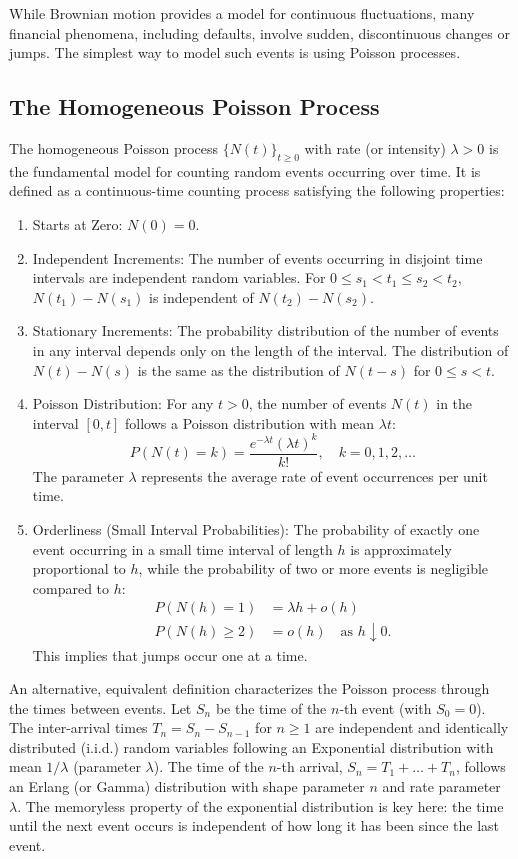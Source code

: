 \documentclass[11pt,twoside,openright]{report}
\begin{document}
While Brownian motion provides a model for continuous fluctuations, many financial phenomena, including defaults, involve sudden, discontinuous changes or jumps. The simplest way to model such events is using Poisson processes.

\subsection{The Homogeneous Poisson Process}
\label{subsec:homo_poisson}

The homogeneous Poisson process $\{N(t)\}_{t \ge 0}$ with rate (or intensity) $\lambda > 0$ is the fundamental model for counting random events occurring over time. It is defined as a continuous-time counting process satisfying the following properties:
\begin{enumerate}
    \item Starts at Zero: $N(0) = 0$.
    \item Independent Increments: The number of events occurring in disjoint time intervals are independent random variables. For $0 \le s_1 < t_1 \le s_2 < t_2$, $N(t_1) - N(s_1)$ is independent of $N(t_2) - N(s_2)$.
    \item Stationary Increments: The probability distribution of the number of events in any interval depends only on the length of the interval. The distribution of $N(t) - N(s)$ is the same as the distribution of $N(t-s)$ for $0 \le s < t$.
    \item Poisson Distribution: For any $t > 0$, the number of events $N(t)$ in the interval $[0, t]$ follows a Poisson distribution with mean $\lambda t$:
    \[ P(N(t)=k) = \frac{e^{-\lambda t}(\lambda t)^k}{k!}, \quad k = 0, 1, 2, \dots \]
    The parameter $\lambda$ represents the average rate of event occurrences per unit time.
    \item Orderliness (Small Interval Probabilities): The probability of exactly one event occurring in a small time interval of length $h$ is approximately proportional to $h$, while the probability of two or more events is negligible compared to $h$:
    \begin{align*}
        P(N(h)=1) &= \lambda h + o(h) \\
        P(N(h) \ge 2) &= o(h) \quad \text{as } h \downarrow 0.
    \end{align*}
    This implies that jumps occur one at a time.
\end{enumerate}
An alternative, equivalent definition characterizes the Poisson process through the times between events. Let $S_n$ be the time of the $n$-th event (with $S_0 = 0$). The inter-arrival times $T_n = S_n - S_{n-1}$ for $n \ge 1$ are independent and identically distributed (i.i.d.) random variables following an Exponential distribution with mean $1/\lambda$ (parameter $\lambda$). The time of the $n$-th arrival, $S_n = T_1 + \dots + T_n$, follows an Erlang (or Gamma) distribution with shape parameter $n$ and rate parameter $\lambda$. The memoryless property of the exponential distribution is key here: the time until the next event occurs is independent of how long it has been since the last event.
\end{document}
